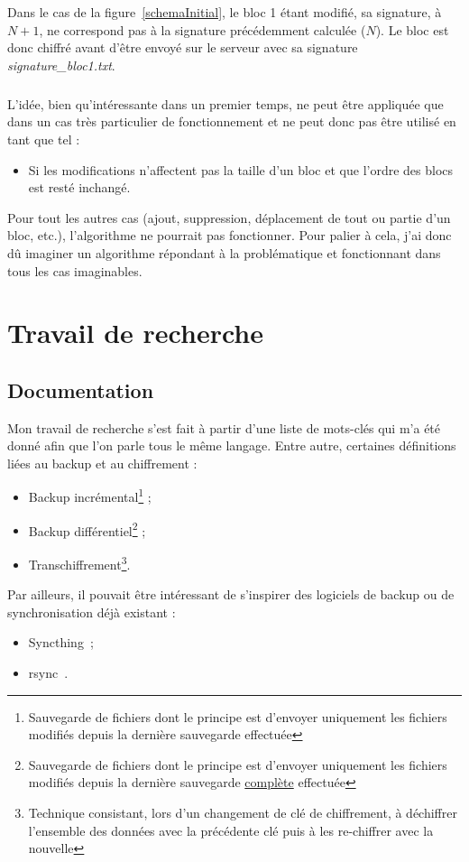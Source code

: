 \documentclass[a4paper,10pt, twoside]{report}
\begin{document}
\begin{spacing}{1.2}
Dans le cas de la figure~\ref{schemaInitial}, le bloc 1 étant modifié, sa
signature, à \(N + 1\), ne correspond pas à la signature précédemment
calculée (\(N\)). Le bloc est donc chiffré avant d'être envoyé sur le
serveur avec sa signature \textit{signature\_bloc1.txt}.

\subparagraph{}
L'idée, bien qu'intéressante dans un premier temps, ne peut être
appliquée que dans un cas très particulier de fonctionnement et ne peut
donc pas être utilisé en tant que tel :
\begin{itemize}
 \item[] Si les modifications n'affectent pas la taille d'un bloc et que l'ordre
 des blocs est resté inchangé.
\end{itemize}

Pour tout les autres cas (ajout, suppression, déplacement de tout ou partie
d'un bloc, etc.), l'algorithme ne pourrait pas fonctionner. Pour palier à
cela, j'ai donc dû imaginer un algorithme répondant à la problématique
et fonctionnant dans tous les cas imaginables.

\section{Travail de recherche}
\label{secTravailRecherche}
\subsection{Documentation}

Mon travail de recherche s'est fait à partir d'une liste de mots-clés qui
m'a été donné afin que l'on parle tous le même langage. Entre autre,
certaines définitions liées au backup et au chiffrement :
\begin{itemize}
 \item Backup incrémental\footnote{Sauvegarde de fichiers dont le principe est
 d'envoyer uniquement les fichiers modifiés depuis la dernière sauvegarde
 effectuée} ;
 \item Backup différentiel\footnote{Sauvegarde de fichiers dont le principe
 est d'envoyer uniquement les fichiers modifiés depuis la dernière
 sauvegarde \underline{complète} effectuée} ;
 \item Transchiffrement\footnote{Technique consistant, lors d'un changement
 de clé de chiffrement, à déchiffrer l'ensemble des données avec la
 précédente clé puis à les re-chiffrer avec la nouvelle}.
\end{itemize}

Par ailleurs, il pouvait être intéressant de s'inspirer des logiciels de backup
ou de synchronisation déjà existant :
\begin{itemize}
 \item Syncthing~\cite{refSyncthing};
 \item rsync~\cite{refRsync}.
\end{itemize}


\end{spacing}
\end{document}
